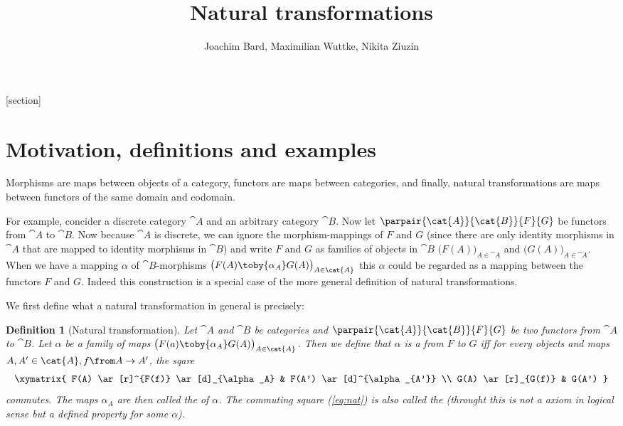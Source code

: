 \def\pathToRoot{../../}
% 

\newcommand{\catA}[0]{\cat{A}}
\newcommand{\catB}[0]{\cat{B}}

[section]
\newtheorem{defn}[counter]{Definition}
\newtheorem{exmp}[counter]{Example}
\newtheorem{lemma}[counter]{Lemma}


\title{Natural transformations}
\author{Joachim Bard, Maximilian Wuttke, Nikita Ziuzin}



\maketitle


\section*{Motivation, definitions and examples}
Morphisms are maps between objects of a category, functors are maps between categories, and finally, natural transformations are maps between functors of the same domain and codomain.

For example, concider a discrete category $\catA$ and an arbitrary category $\catB$.
Now let $\parpair{\catA}{\catB}{F}{G}$ be functors from $\catA$ to $\catB$.
Now because $\catA$ is discrete, we can ignore the morphism-mappings of $F$ and $G$ (since there are only identity morphisms in $\catA$ that are mapped to identity morphisms in $\catB$) and write $F$ and $G$ as families
of objects in $\catB$
$\bigl(F(A)\bigr)_{A\in\catA}$ and $\bigl(G(A)\bigr)_{A\in\catA}$.
When we have a mapping $\alpha$ of $\catB$-morphisms
$\bigl(F(A)\toby{\alpha_A}G(A)\bigr)_{A\in\catA}$
this $\alpha$ could be regarded as a mapping between the functors $F$ and $G$.
Indeed this construction is a special case of the more general definition of natural transformations.

We first define what a natural transformation in general is precisely:
\begin{defn}[Natural transformation]
  \label{def:nat}
  Let $\catA$ and $\catB$ be categories and $\parpair{\catA}{\catB}{F}{G}$ be two functors from $\catA$ to $\catB$.
  Let $\alpha$ be a family of maps
  $\bigl(F(a)\toby{\alpha_A}G(A)\bigr)_{A\in\catA}$.
  Then we define that $\alpha$ is a  from $F$ to $G$ iff
  for every objects and maps $A, A' \in \catA, f \from A \to A'$, the sqare
  \begin{equation}
    \label{eq:nat}
    \begin{array}{c}
      \xymatrix{
        F(A) \ar[r]^{F(f)} \ar[d]_{\alpha_A} & F(A') \ar[d]^{\alpha_{A'}} \\
        G(A) \ar[r]_{G(f)} & G(A')
      }
    \end{array}
  \end{equation}
  commutes.
  The maps $\alpha_A$ are then called the  of $\alpha$.
  The commuting square (\ref{eq:nat}) is also called the  (throught this is not a axiom in logical sense but a defined property for some $\alpha$).
\end{defn}

